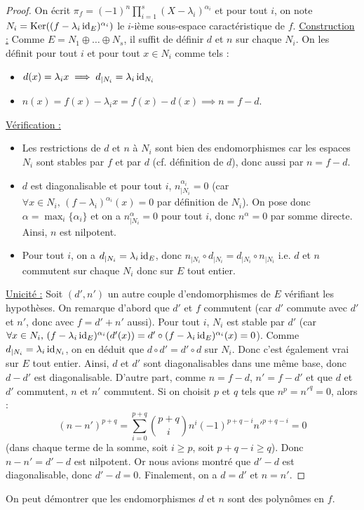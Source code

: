   \begin{proof}
    On écrit $\pi_f = (-1)^n \prod_{i=1}^s (X - \lambda_i)^{\alpha_i}$ et pour tout $i$, on note $N_i = \mathrm{Ker}((f-\lambda_i \operatorname{id}_E)^{\alpha_i})$ le $i$-ième sous-espace caractéristique de $f$.
    \newpar
    \uline{Construction :} Comme $E = N_1 \oplus \dots \oplus N_s$, il suffit de définir $d$ et $n$ sur chaque $N_i$. On les définit pour tout $i$ et pour tout $x \in N_i$ comme tels :
    \begin{itemize}
      \item $d(x) = \lambda_i x \implies d_{|N_i} = \lambda_i \operatorname{id}_{N_i}$
      \item $n(x) = f(x) - \lambda_i x = f(x) - d(x) \implies n = f - d$.
    \end{itemize}
    \medskip
    \uline{Vérification :}
    \begin{itemize}
      \item Les restrictions de $d$ et $n$ à $N_i$ sont bien des endomorphismes car les espaces $N_i$ sont stables par $f$ et par $d$ (cf. définition de $d$), donc aussi par $n = f - d$.
      \item $d$ est diagonalisable et pour tout $i$, $n_{|N_i}^{\alpha_i} = 0$ (car $\forall x \in N_i, \, (f-\lambda_i)^{\alpha_i}(x) = 0$ par définition de $N_i$). On pose donc $\alpha = \max_{i} \{ \alpha_i \}$ et on a $n_{|N_i}^\alpha = 0$ pour tout $i$, donc $n^\alpha = 0$ par somme directe. Ainsi, $n$ est nilpotent.
      \item Pour tout $i$, on a $d_{|N_i} = \lambda_i \operatorname{id}_E$, donc $n_{|N_i} \circ d_{|N_i} = d_{|N_i} \circ n_{|N_i}$ i.e. $d$ et $n$ commutent sur chaque $N_i$ donc sur $E$ tout entier.
    \end{itemize}
    \medskip
    \uline{Unicité :} Soit $(d', n')$ un autre couple d'endomorphismes de $E$ vérifiant les hypothèses. On remarque d'abord que $d'$ et $f$ commutent (car $d'$ commute avec $d'$ et $n'$, donc avec $f = d' + n'$ aussi). Pour tout $i$, $N_i$ est stable par $d'$ (car $\forall x \in N_i, \, (f-\lambda_i \operatorname{id}_E)^{\alpha_i}(d'(x)) = d' \circ (f-\lambda_i \operatorname{id}_E)^{\alpha_i}(x) = 0$). Comme $d_{|N_i} = \lambda_i \operatorname{id}_{N_i}$, on en déduit que $d \circ d' = d' \circ d$ sur $N_i$. Donc c'est également vrai sur $E$ tout entier. Ainsi, $d$ et $d'$ sont diagonalisables dans une même base, donc $d - d'$ est diagonalisable.
    \newpar
    D'autre part, comme $n = f-d$, $n' = f-d'$ et que $d$ et $d'$ commutent, $n$ et $n'$ commutent. Si on choisit $p$ et $q$ tels que $n^p = n'^q = 0$, alors :
    \[ (n-n')^{p+q} = \sum_{i=0}^{p+q} \binom{p+q}{i} n^{i} (-1)^{p+q-i} n'^{p+q-i} = 0 \]
    (dans chaque terme de la somme, soit $i \geq p$, soit $p+q-i \geq q$). Donc $n - n' = d' - d$ est nilpotent. Or nous avions montré que $d' - d$ est diagonalisable, donc $d'-d = 0$. Finalement, on a $d = d'$ et $n = n'$.
  \end{proof}

  \begin{remark}
    On peut démontrer que les endomorphismes $d$ et $n$ sont des polynômes en $f$.
  \end{remark}

